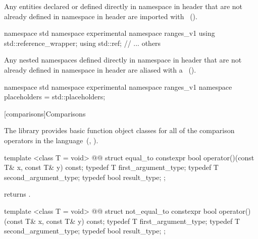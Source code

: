 {\color{newclr}
\pnum
Any entities declared or defined directly in namespace  in header 
that are not already defined in namespace  in header
 are imported with
~(). \enterexample
\begin{codeblock}
namespace std { namespace experimental { namespace ranges_v1 {
  using std::reference_wrapper;
  using std::ref;
  // ... others
}}}
\end{codeblock}
\exitexample

\pnum
Any nested namespaces defined directly in namespace  in header 
that are not already defined in namespace  in header
 are aliased with a
~(). \enterexample
\begin{codeblock}
namespace std { namespace experimental { namespace ranges_v1 {
  namespace placeholders = std::placeholders;
}}}
\end{codeblock}
\exitexample
}

\setcounter{subsection}{5}
[comparisons]{Comparisons}

\pnum
The library provides basic function object classes for all of the comparison
operators in the language~(, ).

%
\begin{itemdecl}
template <class T = void>
  @@
struct equal_to {
  constexpr bool operator()(const T& x, const T& y) const;
  typedef T first_argument_type;
  typedef T second_argument_type;
  typedef bool result_type;
};
\end{itemdecl}

\begin{itemdescr}
\pnum
{} returns .
\end{itemdescr}

%
\begin{itemdecl}
template <class T = void>
  @@
struct not_equal_to {
  constexpr bool operator()(const T& x, const T& y) const;
  typedef T first_argument_type;
  typedef T second_argument_type;
  typedef bool result_type;
};
\end{itemdecl}

